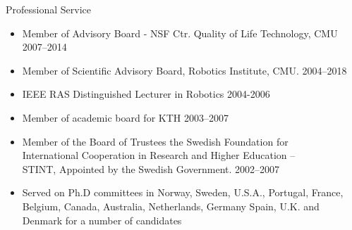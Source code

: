 \documentclass{article}
\begin{document}
\begin{cv}
\begin{cvlist}{Professional Service}
\begin{itemize}
  \item Member of Advisory Board - NSF Ctr. Quality of Life Technology,
    CMU \cftdotfill{\cftdotsep} 2007--2014
  \item Member of Scientific Advisory Board, Robotics Institute, CMU. \cftdotfill{\cftdotsep}  2004--2018
  \item IEEE RAS Distinguished Lecturer in Robotics \cftdotfill{\cftdotsep} 2004-2006
  \item Member of academic board for KTH \cftdotfill{\cftdotsep}
    2003--2007
  \item Member of the Board of Trustees the Swedish Foundation for\\
    International Cooperation in Research and Higher Education --\\
    STINT, Appointed by the Swedish Government.
    \cftdotfill{\cftdotsep} 2002--2007
  \item Served on Ph.D committees in Norway, Sweden, U.S.A., Portugal,
    France, Belgium, Canada, Australia, Netherlands, Germany Spain,
    U.K. and Denmark for a number of candidates
  \end{itemize}


\end{cvlist}
\end{cv}
\end{document}
